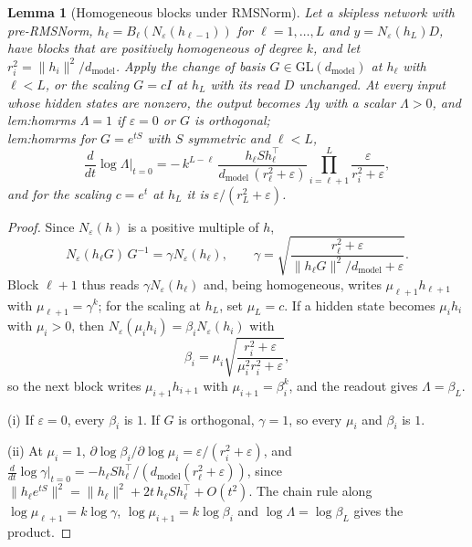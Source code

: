 \documentclass[10pt]{article}
\newtheorem{lemma}[theorem]{Lemma}
\theoremstyle{definition}
\theoremstyle{remark}
\newcommand{\dm}{d_{\mathrm{model}}}
\newcommand{\GL}{\mathrm{GL}}
\newcommand{\norm}[1]{\lVert #1\rVert}
\newcommand{\ptlabel}[1]{\phantomsection\label{#1}}
\newcommand{\stpart}[3]{\ifx\relax#1\relax\else\ptlabel{#1:#2}\fi{\upshape\bfseries\boldmath(#2)\ifx\relax#3\relax\else\ #3.\fi}}
\begin{document}
\begin{lemma}[Homogeneous blocks under RMSNorm]\label{lem:homrms}
Let a skipless network with pre-RMSNorm, $h_\ell = B_\ell(N_\varepsilon(h_{\ell-1}))$ for $\ell = 1, \dots, L$ and $y = N_\varepsilon(h_L)D$, have blocks that are positively homogeneous of degree $k$, and let $r_i^2 = \norm{h_i}^2/\dm$. Apply the change of basis $G \in \GL(\dm)$ at $h_\ell$ with $\ell < L$, or the scaling $G = cI$ at $h_L$ with its read $D$ unchanged. At every input whose hidden states are nonzero, the output becomes $\Lambda y$ with a scalar $\Lambda > 0$, and\\
\stpart{lem:homrms}{i}{} $\Lambda = 1$ if $\varepsilon = 0$ or $G$ is orthogonal;\\
\stpart{lem:homrms}{ii}{} for $G = e^{tS}$ with $S$ symmetric and $\ell < L$,
\[
\frac{d}{dt}\log\Lambda\Big|_{t=0} = -\,k^{L-\ell}\,\frac{h_\ell S h_\ell^\top}{\dm\,(r_\ell^2+\varepsilon)}\prod_{i=\ell+1}^{L}\frac{\varepsilon}{r_i^2+\varepsilon},
\]
and for the scaling $c = e^t$ at $h_L$ it is $\varepsilon/(r_L^2+\varepsilon)$.
\end{lemma}
\begin{proof}
Since $N_\varepsilon(h)$ is a positive multiple of $h$,
\[
N_\varepsilon(h_\ell G)\,G^{-1} = \gamma N_\varepsilon(h_\ell), \qquad \gamma = \sqrt{\frac{r_\ell^2+\varepsilon}{\norm{h_\ell G}^2/\dm+\varepsilon}}.
\]
Block $\ell+1$ thus reads $\gamma N_\varepsilon(h_\ell)$ and, being homogeneous, writes $\mu_{\ell+1}h_{\ell+1}$ with $\mu_{\ell+1} = \gamma^k$; for the scaling at $h_L$, set $\mu_L = c$. If a hidden state becomes $\mu_i h_i$ with $\mu_i > 0$, then $N_\varepsilon(\mu_i h_i) = \beta_i N_\varepsilon(h_i)$ with
\[
\beta_i = \mu_i\sqrt{\frac{r_i^2+\varepsilon}{\mu_i^2 r_i^2+\varepsilon}},
\]
so the next block writes $\mu_{i+1}h_{i+1}$ with $\mu_{i+1} = \beta_i^k$, and the readout gives $\Lambda = \beta_L$.

(i) If $\varepsilon = 0$, every $\beta_i$ is $1$. If $G$ is orthogonal, $\gamma = 1$, so every $\mu_i$ and $\beta_i$ is $1$.

(ii) At $\mu_i = 1$, $\partial\log\beta_i/\partial\log\mu_i = \varepsilon/(r_i^2+\varepsilon)$, and $\frac{d}{dt}\log\gamma\big|_{t=0} = -h_\ell S h_\ell^\top/(\dm(r_\ell^2+\varepsilon))$, since $\norm{h_\ell e^{tS}}^2 = \norm{h_\ell}^2 + 2t\,h_\ell S h_\ell^\top + O(t^2)$. The chain rule along $\log\mu_{\ell+1} = k\log\gamma$, $\log\mu_{i+1} = k\log\beta_i$ and $\log\Lambda = \log\beta_L$ gives the product.
\end{proof}
\end{document}
